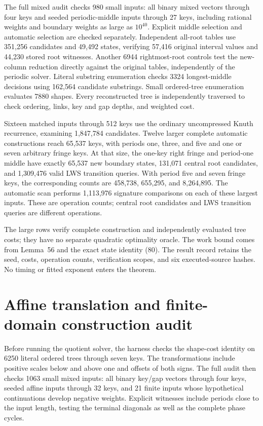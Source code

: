 \documentclass[11pt]{article}
\begin{document}
The full mixed audit checks 980 small inputs: all binary mixed vectors
through four keys and seeded periodic-middle inputs through 27 keys,
including rational weights and boundary weights as large as $10^{40}$.
Explicit middle selection and automatic selection are checked separately.
Independent all-root tables use 351,256 candidates and 49,492 states,
verifying 57,416 original interval values and 44,230 stored root witnesses.
Another 6944 rightmost-root controls test the new-column reduction directly
against the original tables, independently of the periodic solver. Literal
substring enumeration checks 3324 longest-middle decisions using 162,564
candidate substrings. Small ordered-tree enumeration evaluates 7880 shapes.
Every reconstructed tree is independently traversed to check ordering,
links, key and gap depths, and weighted cost.

Sixteen matched inputs through 512 keys use the ordinary uncompressed Knuth
recurrence, examining 1,847,784 candidates. Twelve larger complete automatic
constructions reach 65,537 keys, with periods one, three, and five and one
or seven arbitrary fringe keys. At that size, the one-key right fringe and
period-one middle have exactly 65,537 new boundary states, 131,071 central
root candidates, and 1,309,476 valid LWS transition queries. With period
five and seven fringe keys, the corresponding counts are 458,738, 655,295,
and 8,264,895. The automatic scan performs 1,113,976 signature comparisons
on each of these largest inputs. These are operation counts; central root
candidates and LWS transition queries are different operations.

The large rows verify complete construction and independently evaluated tree
costs; they have no separate quadratic optimality oracle. The work bound
comes from Lemma~56 and the exact state identity
(80). The result record retains the seed, costs, operation
counts, verification scopes, and six executed-source hashes. No timing or
fitted exponent enters the theorem.

\clearpage
\section{Affine translation and finite-domain construction audit}
\label{app:affine-period}

Before running the quotient solver, the harness checks the shape-cost
identity on 6250 literal ordered trees through seven keys. The transformations
include positive scales below and above one and offsets of both signs.
The full audit then checks 1063 small mixed inputs: all binary key/gap
vectors through four keys, seeded affine inputs through 32 keys, and 21
finite inputs whose hypothetical continuations develop negative weights.
Explicit witnesses include periods close to the input length, testing the
terminal diagonals as well as the complete phase cycles.
\end{document}
